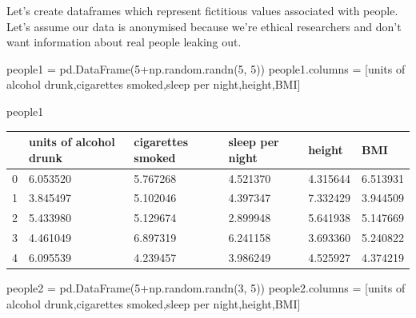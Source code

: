 \documentclass[
  letterpaper,
  DIV=11,
  numbers=noendperiod]{scrreprt}
\newenvironment{Shaded}{\begin{snugshade}}{\end{snugshade}}
\newcommand{\DecValTok}[1]{\textcolor[rgb]{0.68,0.00,0.00}{#1}}
\newcommand{\NormalTok}[1]{\textcolor[rgb]{0.00,0.23,0.31}{#1}}
\newcommand{\OperatorTok}[1]{\textcolor[rgb]{0.37,0.37,0.37}{#1}}
\newcommand{\StringTok}[1]{\textcolor[rgb]{0.13,0.47,0.30}{#1}}
\begin{document}
Let's create dataframes which represent fictitious values associated
with people. Let's assume our data is anonymised because we're ethical
researchers and don't want information about real people leaking out.

\begin{Shaded}
\begin{Highlighting}[]
\NormalTok{people1 }\OperatorTok{=}\NormalTok{ pd.DataFrame(}\DecValTok{5}\OperatorTok{+}\NormalTok{np.random.randn(}\DecValTok{5}\NormalTok{, }\DecValTok{5}\NormalTok{))}
\NormalTok{people1.columns }\OperatorTok{=}\NormalTok{ [}\StringTok{\textquotesingle{}units of alcohol drunk\textquotesingle{}}\NormalTok{,}\StringTok{\textquotesingle{}cigarettes smoked\textquotesingle{}}\NormalTok{,}\StringTok{\textquotesingle{}sleep per night\textquotesingle{}}\NormalTok{,}\StringTok{\textquotesingle{}height\textquotesingle{}}\NormalTok{,}\StringTok{\textquotesingle{}BMI\textquotesingle{}}\NormalTok{]}
\end{Highlighting}
\end{Shaded}

\begin{Shaded}
\begin{Highlighting}[]
\NormalTok{people1}
\end{Highlighting}
\end{Shaded}

\begin{longtable}[]{@{}llllll@{}}
\toprule()
& units of alcohol drunk & cigarettes smoked & sleep per night & height
& BMI \\
\midrule()
\endhead
0 & 6.053520 & 5.767268 & 4.521370 & 4.315644 & 6.513931 \\
1 & 3.845497 & 5.102046 & 4.397347 & 7.332429 & 3.944509 \\
2 & 5.433980 & 5.129674 & 2.899948 & 5.641938 & 5.147669 \\
3 & 4.461049 & 6.897319 & 6.241158 & 3.693360 & 5.240822 \\
4 & 6.095539 & 4.239457 & 3.986249 & 4.525927 & 4.374219 \\
\bottomrule()
\end{longtable}

\begin{Shaded}
\begin{Highlighting}[]
\NormalTok{people2 }\OperatorTok{=}\NormalTok{ pd.DataFrame(}\DecValTok{5}\OperatorTok{+}\NormalTok{np.random.randn(}\DecValTok{3}\NormalTok{, }\DecValTok{5}\NormalTok{))}
\NormalTok{people2.columns }\OperatorTok{=}\NormalTok{ [}\StringTok{\textquotesingle{}units of alcohol drunk\textquotesingle{}}\NormalTok{,}\StringTok{\textquotesingle{}cigarettes smoked\textquotesingle{}}\NormalTok{,}\StringTok{\textquotesingle{}sleep per night\textquotesingle{}}\NormalTok{,}\StringTok{\textquotesingle{}height\textquotesingle{}}\NormalTok{,}\StringTok{\textquotesingle{}BMI\textquotesingle{}}\NormalTok{]}
\end{Highlighting}
\end{Shaded}
\end{document}
